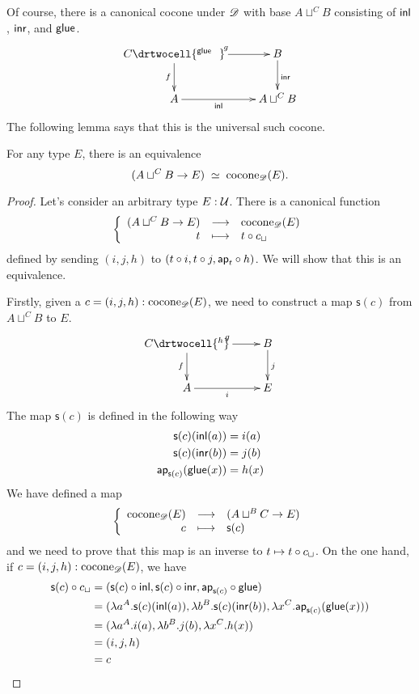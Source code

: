 Of course, there is a canonical cocone under $\mathscr{D}$ with base $A\sqcup^C B$ consisting of $\mathsf{inl}$, $\mathsf{inr}$, and $\mathsf{glue}$.
\[\uppercurveobject{{ }}\lowercurveobject{{ }}\twocellhead{{ }}
\xymatrix{C \ar^g[r] \ar_f[d] \drtwocell{^\glue\ \ } & B \ar^\inr[d] \\
  A \ar_-\inl[r] & A\sqcup^CB }\]
The following lemma says that this is the universal such cocone.

\begin{lem}\label{thm:pushout-ump}
  For any type $E$, there is an equivalence
  \[ (A\sqcup^C B \to E) \;\simeq\; \mathrm{cocone}_{\mathscr{D}}(E). \]
\end{lem}
\begin{proof}
  Let's consider an arbitrary type $E:\mathcal{U}$.
  There is a canonical function
  \[\left\{\begin{array}{rcl}(A\sqcup^CB\to{}E) & \longrightarrow & \mathrm{cocone}_{\mathscr{D}}(E) \\ t & \longmapsto & t\circ c_\sqcup \end{array}\right.\]
  defined by sending $(i,j,h)$ to $(t\circ{}i,t\circ{}j,\mathsf{ap}_{t}\circ{}h)$.
  We will show that this is an equivalence.

  Firstly, given a $c=(i,j,h):\mathrm{cocone}_{\mathscr{D}}(E)$, we need to construct a
  map $\mathsf{s}(c)$ from $A\sqcup^CB$ to $E$.
  \[\uppercurveobject{{ }}\lowercurveobject{{ }}\twocellhead{{ }}
  \xymatrix{C \ar^g[r] \ar_f[d] \drtwocell{^h} & B \ar^{j}[d] \\
    A \ar_-{i}[r] & E }\]
 The map $\mathsf{s}(c)$ is defined in the following way
  \begin{align*}
    \mathsf{s}(c)(\mathsf{inl}(a))&=i(a)\\
    \mathsf{s}(c)(\mathsf{inr}(b))&=j(b)\\
    \mathsf{ap}_{\mathsf{s}(c)}(\mathsf{glue}(x))&=h(x)\\
  \end{align*}
We have defined a map
\[\left\{\begin{array}{rcl}\mathrm{cocone}_{\mathscr{D}}(E) & \longrightarrow & (A\sqcup^BC\to{}E) \\ c & \longmapsto & \mathsf{s}(c) \end{array}\right.\]
and we need to prove that this map is an inverse to
$t\mapsto{}t\circ c_\sqcup$.
On the one hand, if $c=(i,j,h):\mathrm{cocone}_{\mathscr{D}}(E)$, we have
\begin{align*}
  \mathsf{s}(c)\circ c_\sqcup & =
  (\mathsf{s}(c)\circ\mathsf{inl},\mathsf{s}(c)\circ\mathsf{inr},
  \mathsf{ap}_{\mathsf{s}(c)}\circ\mathsf{glue}) \\
  & = (\lambda{}a^A.\mathsf{s}(c)(\mathsf{inl}(a)),\lambda{}b^B.\mathsf{s}(c)(\mathsf{inr}(b)),
  \lambda{}x^C.\mathsf{ap}_{\mathsf{s}(c)}(\mathsf{glue}(x))) \\
  & = (\lambda{}a^A.i(a),\lambda{}b^B.j(b),
  \lambda{}x^C.h(x)) \\
  & = (i, j, h) \\
  & = c
\end{align*}


\end{proof}
